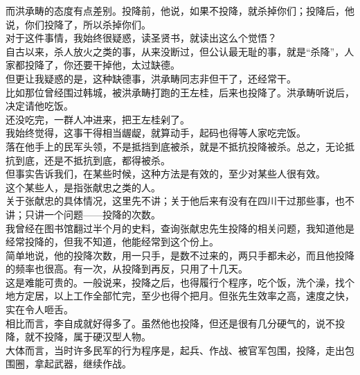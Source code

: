 \begin{multicols}{\theparacolNo}
而洪承畴的态度有点差别。投降前，他说，如果不投降，就杀掉你们；投降后，他说，你们投降了，所以杀掉你们。\\

对于这件事情，我始终很疑惑，读圣贤书，就读出这么个觉悟？\\

自古以来，杀人放火之类的事，从来没断过，但公认最无耻的事，就是“杀降”，人家都投降了，你还要干掉他，太过缺德。\\

但更让我疑惑的是，这种缺德事，洪承畴同志非但干了，还经常干。\\

比如那位曾经围过韩城，被洪承畴打跑的王左桂，后来也投降了。洪承畴听说后，决定请他吃饭。\\

还没吃完，一群人冲进来，把王左桂剁了。\\

我始终觉得，这事干得相当龌龊，就算动手，起码也得等人家吃完饭。\\

落在他手上的民军头领，不是抵挡到底被杀，就是不抵抗投降被杀。总之，无论抵抗到底，还是不抵抗到底，都得被杀。\\

但事实告诉我们，在某些时候，这种方法是有效的，至少对某些人很有效。\\

这个某些人，是指张献忠之类的人。\\

关于张献忠的具体情况，这里先不讲；关于他后来有没有在四川干过那些事，也不讲；只讲一个问题——投降的次数。\\

我曾经在图书馆翻过半个月的史料，查询张献忠先生投降的相关问题，我知道他是经常投降的，但我不知道，他能经常到这个份上。\\

简单地说，他的投降次数，用一只手，是数不过来的，两只手都未必，而且他投降的频率也很高。有一次，从投降到再反，只用了十几天。\\

这是难能可贵的。一般说来，投降之后，也得履行个程序，吃个饭，洗个澡，找个地方定居，以上工作全部忙完，至少也得个把月。但张先生效率之高，速度之快，实在令人咂舌。\\

相比而言，李自成就好得多了。虽然他也投降，但还是很有几分硬气的，说不投降，就不投降，属于硬汉型人物。\\

大体而言，当时许多民军的行为程序是，起兵、作战、被官军包围，投降，走出包围圈，拿起武器，继续作战。\\


\end{multicols}
